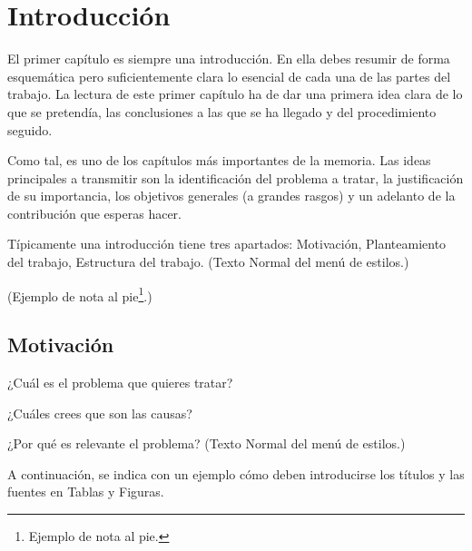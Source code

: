 \section{Introducción}

El primer capítulo es siempre una introducción. En ella debes resumir de forma esquemática pero suficientemente clara lo esencial de cada una de las partes del trabajo. La lectura de este primer capítulo ha de dar una primera idea clara de lo que se pretendía, las conclusiones a las que se ha llegado y del procedimiento seguido.

Como tal, es uno de los capítulos más importantes de la memoria. Las ideas principales a transmitir son la identificación del problema a tratar, la justificación de su importancia, los objetivos generales (a grandes rasgos) y un adelanto de la contribución que esperas hacer.

Típicamente una introducción tiene tres apartados: Motivación, Planteamiento del trabajo, Estructura del trabajo. (Texto Normal del menú de estilos.)

(Ejemplo de nota al pie\footnote{Ejemplo de nota al pie.}.)

\subsection{Motivación}

¿Cuál es el problema que quieres tratar?

¿Cuáles crees que son las causas?

¿Por qué es relevante el problema? (Texto Normal del menú de estilos.)

A continuación, se indica con un ejemplo cómo deben introducirse los títulos y las fuentes en Tablas y Figuras.